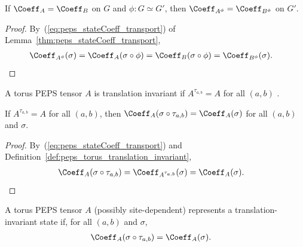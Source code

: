 \begin{lemma}%
    \label{thm:peps_sameState_transport}
    \leanok
    If $\Coeff_A=\Coeff_B$ on $G$ and $\phi:G\simeq G'$, then
    $\Coeff_{A^\phi}=\Coeff_{B^\phi}$ on $G'$.
\end{lemma}
\begin{proof}\leanok
    By~(\ref{eq:peps_stateCoeff_transport}) of Lemma~\ref{thm:peps_stateCoeff_transport},
    \begin{align}
        \Coeff_{A^\phi}(\sigma)
         & =\Coeff_A(\sigma\circ\phi)
        =\Coeff_B(\sigma\circ\phi)
        =\Coeff_{B^\phi}(\sigma).
        \notag
    \end{align}
\end{proof}

\begin{definition}%
    \label{def:peps_torus_translation_invariant}
    \leanok
    A torus PEPS tensor $A$ is translation invariant if $A^{\tau_{a,b}}=A$ for
    all $(a,b)$ \cite[Theorem~3]{Molnar2018NormalPEPS}.
\end{definition}

\begin{lemma}%
    \label{thm:peps_stateCoeff_translationInvariant}
    \leanok
    If $A^{\tau_{a,b}}=A$ for all $(a,b)$, then
    $\Coeff_A(\sigma\circ\tau_{a,b})=\Coeff_A(\sigma)$ for all $(a,b)$ and $\sigma$.
\end{lemma}
\begin{proof}\leanok
    By~(\ref{eq:peps_stateCoeff_transport}) and Definition~\ref{def:peps_torus_translation_invariant},
    \begin{align}
        \Coeff_A(\sigma\circ\tau_{a,b})
         & =\Coeff_{A^{\tau_{a,b}}}(\sigma)
        =\Coeff_A(\sigma).
        \notag
    \end{align}
\end{proof}

\begin{definition}%
    \label{def:peps_torus_state_translation_invariant}
    \leanok
    A torus PEPS tensor $A$ (possibly site-dependent) represents a
    translation-invariant state if, for all $(a,b)$ and $\sigma$,
    \begin{align}
        \Coeff_A(\sigma\circ\tau_{a,b})
         & =\Coeff_A(\sigma).
        \label{eq:peps_torus_state_ti}
    \end{align}
\end{definition}

